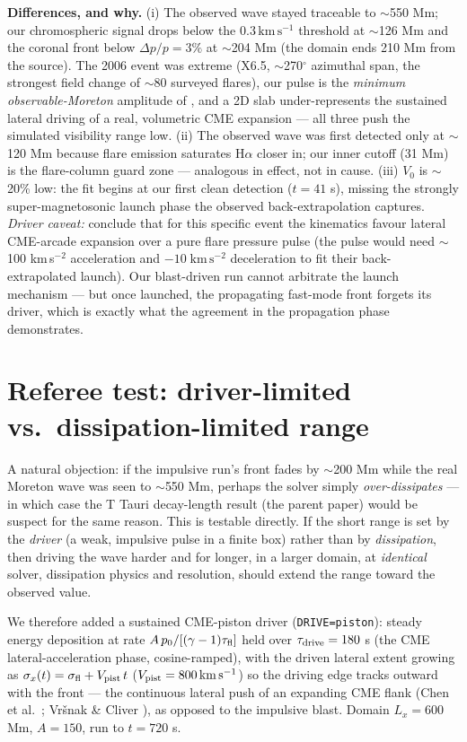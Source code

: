 \documentclass[11pt,a4paper]{article}
\newcommand{\kms}{\,\mathrm{km\,s^{-1}}}
\begin{document}
\medskip\noindent\textbf{Differences, and why.} (i) The observed wave stayed traceable to
$\sim$550 Mm; our chromospheric signal drops below the $0.3\kms$ threshold at
$\sim$126 Mm and the coronal front below $\Delta p/p=3\%$ at $\sim$204 Mm (the domain
ends 210 Mm from the source). The 2006 event was extreme (X6.5, $\sim$270$^\circ$
azimuthal span, the strongest field change of $\sim$80 surveyed flares), our pulse is the
\emph{minimum observable-Moreton} amplitude of \cite{Krause2015}, and a 2D slab
under-represents the sustained lateral driving of a real, volumetric CME expansion ---
all three push the simulated visibility range low. (ii) The observed wave was first
detected only at $\sim$120 Mm because flare emission saturates H$\alpha$ closer in; our
inner cutoff (31 Mm) is the flare-column guard zone --- analogous in effect, not in
cause. (iii) $V_0$ is $\sim$20\% low: the fit begins at our first clean detection
($t=41$ s), missing the strongly super-magnetosonic launch phase the observed
back-extrapolation captures. \emph{Driver caveat:} \cite{Bala2010} conclude that for
this specific event the kinematics favour lateral CME-arcade expansion over a pure flare
pressure pulse (the pulse would need $\sim$100 km\,s$^{-2}$ acceleration and
$-10\;\mathrm{km\,s^{-2}}$ deceleration to fit their back-extrapolated launch). Our
blast-driven run cannot arbitrate the launch mechanism --- but once launched, the
propagating fast-mode front forgets its driver, which is exactly what the agreement in
the propagation phase demonstrates.


\section{Referee test: driver-limited vs.\ dissipation-limited range}

A natural objection: if the impulsive run's front fades by $\sim$200 Mm while the real
Moreton wave was seen to $\sim$550 Mm, perhaps the solver simply \emph{over-dissipates} ---
in which case the T Tauri decay-length result (the parent paper) would be suspect for the
same reason. This is testable directly. If the short range is set by the \emph{driver}
(a weak, impulsive pulse in a finite box) rather than by \emph{dissipation}, then driving
the wave harder and for longer, in a larger domain, at \emph{identical} solver, dissipation
physics and resolution, should extend the range toward the observed value.

We therefore added a sustained CME-piston driver (\texttt{DRIVE=piston}): steady energy
deposition at rate $A\,p_0/[(\gamma-1)\tau_{\rm fl}]$ held over $\tau_{\rm drive}=180$ s
(the CME lateral-acceleration phase, cosine-ramped), with the driven lateral extent growing
as $\sigma_x(t)=\sigma_{\rm fl}+V_{\rm pist}\,t$ ($V_{\rm pist}=800\kms$) so the driving edge
tracks outward with the front --- the continuous lateral push of an expanding CME flank
(Chen et al.\ \cite{Chen2002}; Vršnak \& Cliver \cite{VrsnakCliver2008}), as opposed to the
impulsive blast. Domain $L_x=600$ Mm, $A=150$, run to $t=720$ s.
\end{document}
